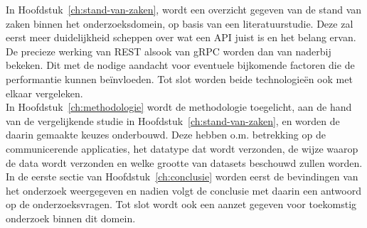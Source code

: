In Hoofdstuk~\ref{ch:stand-van-zaken}, wordt een overzicht gegeven van de stand van zaken binnen het onderzoeksdomein, op basis van een literatuurstudie.
Deze zal eerst meer duidelijkheid scheppen over wat een API juist is en het belang ervan. De precieze werking van REST alsook van gRPC
worden dan van naderbij bekeken. Dit met de nodige aandacht voor eventuele bijkomende factoren die de performantie kunnen beïnvloeden.
Tot slot worden beide technologieën ook met elkaar vergeleken.\\

In Hoofdstuk~\ref{ch:methodologie} wordt de methodologie toegelicht, aan de hand van de vergelijkende studie in Hoofdstuk~\ref{ch:stand-van-zaken}, en worden de daarin gemaakte keuzes onderbouwd.
Deze hebben o.m. betrekking op de communicerende applicaties, het datatype dat wordt verzonden, de wijze waarop de data wordt verzonden
en welke grootte van datasets beschouwd zullen worden.\\

In de eerste sectie van Hoofdstuk~\ref{ch:conclusie} worden eerst de bevindingen van het onderzoek weergegeven en nadien
volgt de conclusie met daarin een antwoord op de onderzoeksvragen.
Tot slot wordt ook een aanzet gegeven voor toekomstig onderzoek binnen dit domein.